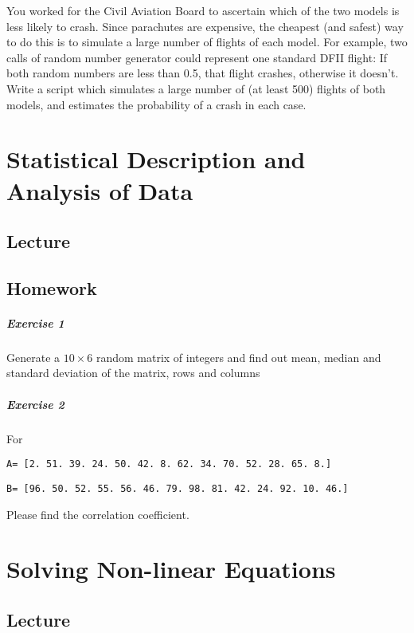 \documentclass[a4paper]{book}
\begin{document}
You worked for the Civil Aviation Board to ascertain which of the two
models is less likely to crash. Since parachutes are expensive, the
cheapest (and safest) way to do this is to simulate a large number of
flights of each model. For example, two calls of random number
generator could represent one standard DFII flight: If both random
numbers are less than 0.5, that flight crashes, otherwise it doesn't. Write
a script which simulates a large number of (at least 500) flights of both
models, and estimates the probability of a crash in each case.



\chapter{Statistical Description and Analysis of Data}
\section{Lecture}

\section{Homework}
\paragraph{Exercise 1}
Generate a $10\times6$ random matrix of integers and find out mean, 
median and standard deviation of the matrix, rows and columns


\paragraph{Exercise 2}
For

{\tt A= [2. 51. 39. 24. 50. 42. 8. 62. 34. 70. 52. 28. 65. 8.]}

{\tt B= [96. 50. 52. 55. 56. 46. 79. 98. 81. 42. 24. 92. 10. 46.]}


Please find the correlation coefficient.



\chapter{Solving Non-linear Equations}
\section{Lecture}

\end{document}
